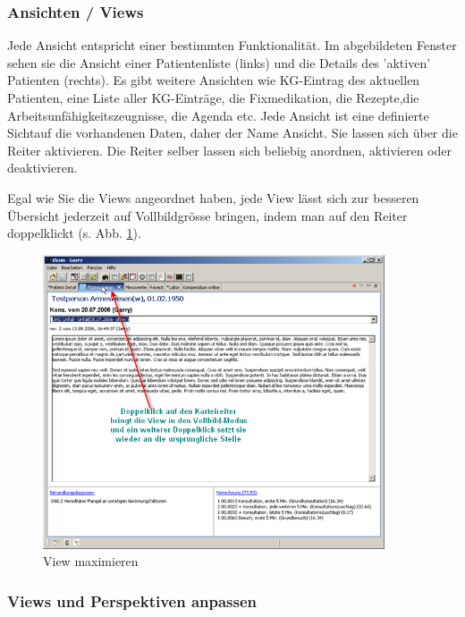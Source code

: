 \subsubsection{Ansichten / Views}
Jede Ansicht entspricht einer bestimmten Funktionalität. Im abgebildeten Fenster sehen sie die Ansicht einer Patientenliste (links) und die Details des 'aktiven' Patienten (rechts). Es gibt weitere Ansichten wie KG-Eintrag des aktuellen Patienten, eine Liste aller KG-Einträge, die Fixmedikation, die Rezepte,die Arbeitsunfähigkeitszeugnisse,
die Agenda etc. Jede Ansicht ist eine definierte \glqq Sicht\grqq auf die vorhandenen Daten, daher der Name \glqq Ansicht\grqq. Sie lassen sich über die Reiter aktivieren. Die Reiter selber lassen sich beliebig anordnen, aktivieren oder deaktivieren.

Egal wie Sie die Views angeordnet haben, jede View lässt sich zur besseren
Übersicht jederzeit auf Vollbildgrösse bringen, indem man auf den Reiter
doppelklickt (s. Abb. \ref{fig:tour3}).

\begin{figure}[htp]
\begin{center}
  \includegraphics[width=0.9\textwidth]{images/tour3}
  \caption{View maximieren}
  \label{fig:tour3}
\end{center}
\end{figure}

\subsubsection{Views und Perspektiven anpassen}


